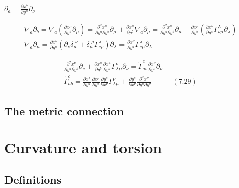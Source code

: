 \documentclass{book}
\begin{document}
$\partial_a = \frac{ \partial x^{\nu} }{ \partial y^{\mu} } \partial_{\nu}$


\[
\begin{gathered}
  \nabla_a \partial_b = \nabla_a \left( \frac{ \partial x^{\mu }}{ \partial y^b } \partial_{\mu} \right) = \frac{ \partial^2 x^{\mu }}{ \partial y^a \partial y^b } \partial_{\mu} + \frac{ \partial x^{\mu }}{ \partial y^b} \nabla_a \partial_{\mu} = \frac{ \partial^2 x^{\mu }}{ \partial y^a \partial y^b } \partial_{\mu} + \frac{ \partial x^{\mu}}{ \partial y^b} \left( \frac{ \partial x^{\nu} }{ \partial y^a} \Gamma^{\lambda}_{\nu \mu } \partial_{\lambda} \right)  \\
\nabla_a \partial_{\mu} = \frac{ \partial x^{\nu } }{ \partial y^a} ( \partial_{\nu} \delta_{\mu}^{ \, \, \nu} + \delta_{\mu}^{ \, \, \rho } \Gamma^{\lambda}_{\nu \rho } ) \partial_{\lambda} = \frac{ \partial x^{\nu } }{ \partial y^a} \Gamma^{\lambda}_{\nu \mu} \partial_{\lambda}
\end{gathered}
\]

\[
\begin{gathered}
  \frac{ \partial^2 x^{\nu }}{ \partial y^a \partial y^b } \partial_{\nu} + \frac{ \partial x^{\mu}}{ \partial y^b} \frac{ \partial x^{\lambda} }{ \partial y^a } \Gamma^{\nu}_{ \lambda \mu } \partial_{\nu} = \widetilde{\Gamma}^c_{ab} \frac{ \partial x^{\nu }}{ \partial y^c} \partial_{\nu} \\  
  \widetilde{\Gamma}^c_{ab} = \frac{ \partial x^{\lambda}}{ \partial y^a } \frac{ \partial x^{\mu} }{ \partial y^b } \frac{ \partial y^c}{ \partial x^{\nu} } \Gamma^{\nu}_{\lambda \mu } + \frac{ \partial y^c}{ \partial x^{\nu }} \frac{ \partial^2 x^{\nu }}{ \partial y^a \partial y^b } \quad \quad \quad (7.29)
\end{gathered}
\]



\subsection{ The metric connection }

\section{ Curvature and torsion }

\subsection{ Definitions }
\end{document}
